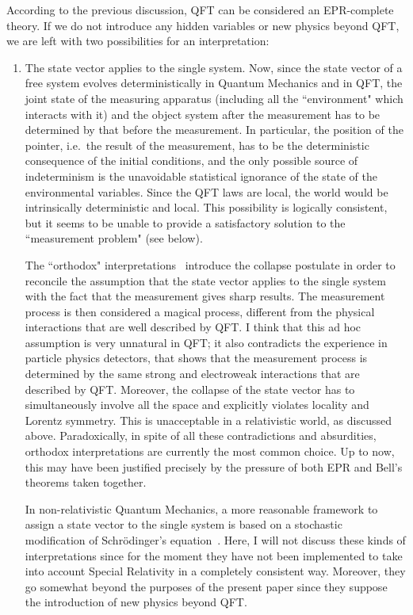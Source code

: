 \documentclass[published]{JHEP3}
\begin{document}
According to the previous discussion, QFT can be considered an
EPR-complete theory. If we do not introduce any hidden variables or
new physics beyond QFT, we are left with two possibilities for an
interpretation:
{\renewcommand{\theenumi}{\Roman{enumi}}  
\begin{enumerate} 
\item The state vector applies to the single system. Now, since the state
vector of a free system evolves deterministically in Quantum Mechanics
and in QFT, the joint state of the measuring apparatus (including all
the ``environment" which interacts with it) and the object system
after the measurement has to be determined by that before the
measurement. In particular, the position of the pointer, i.e.\ the
result of the measurement, has to be the deterministic consequence of
the initial conditions, and the only possible source of indeterminism
is the unavoidable statistical ignorance of the state of the
environmental variables. Since the QFT laws are local, the world would
be intrinsically deterministic and local. This possibility is
logically consistent, but it seems to be unable to provide a
satisfactory solution to the ``measurement problem" (see below).

The ``orthodox" interpretations~\cite{Laloe,Peres} introduce the
collapse postulate in order to reconcile the assumption that the
state vector applies to the single system with the fact that the
measurement gives sharp results. The measurement process is then
considered a magical process, different from the physical
interactions that are well described by QFT. I think that this ad
hoc assumption is very unnatural in QFT; it also contradicts the
experience in particle physics detectors, that shows that the
measurement process is determined by the same strong and
electroweak interactions that are described by QFT. Moreover, the
collapse of the state vector has to simultaneously involve all the
space and explicitly violates locality and Lorentz symmetry. This
is unacceptable in a relativistic world, as discussed above.
Paradoxically, in spite of all these contradictions and
absurdities, orthodox interpretations are currently the most
common choice. Up to now, this may have been justified precisely
by the pressure of both EPR and Bell's theorems taken together.

In non-relativistic Quantum Mechanics, a more reasonable framework to
assign a state vector to the single system is based on a stochastic
modification of Schr\"odinger's equation~\cite{stochastic}. Here, I
will not discuss these kinds of interpretations since for the moment
they have not been implemented to take into account Special Relativity
in a completely consistent way. Moreover, they go somewhat beyond the
purposes of the present paper since they suppose the introduction of
new physics beyond QFT.


\end{enumerate}}
\end{document}
